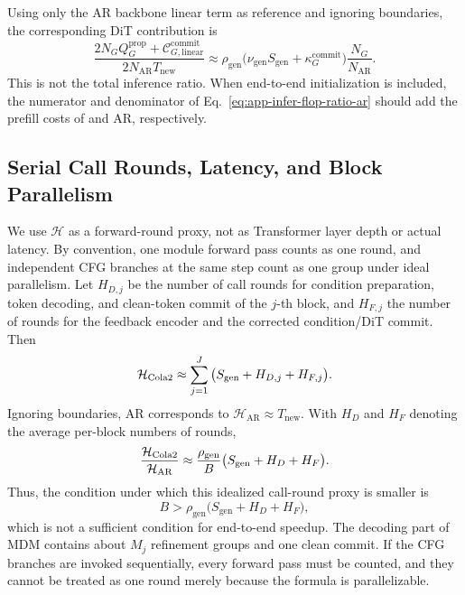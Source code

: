 Using only the AR backbone linear term as reference and ignoring boundaries, the corresponding DiT contribution is
\begin{equation}
    \frac{2N_GQ_G^{\mathrm{prop}}+\mathcal C_{G,\mathrm{linear}}^{\mathrm{commit}}}
         {2N_{\mathrm{AR}}T_{\mathrm{new}}}
    \approx\rho_{\mathrm{gen}}
      \big(\nu_{\mathrm{gen}}S_{\mathrm{gen}}+\kappa_G^{\mathrm{commit}}\big)
      \frac{N_G}{N_{\mathrm{AR}}}.
    \label{eq:app-cost-gen-linear-reference}
\end{equation}
This is not the total inference ratio. When end-to-end initialization is included, the numerator and denominator of Eq.~\eqref{eq:app-infer-flop-ratio-ar} should add the prefill costs of \method and AR, respectively.

\subsection{Serial Call Rounds, Latency, and Block Parallelism}

We use $\mathcal H$ as a forward-round proxy, not as Transformer layer depth or actual latency. By convention, one module forward pass counts as one round, and independent CFG branches at the same step count as one group under ideal parallelism. Let $H_{D,j}$ be the number of call rounds for condition preparation, token decoding, and clean-token commit of the $j$-th block, and $H_{F,j}$ the number of rounds for the feedback encoder and the corrected condition/DiT commit. Then
\begin{equation}
    \mathcal H_{\text{Cola2}}
    \approx\sum_{j=1}^{J}\big(S_{\mathrm{gen}}+H_{D,j}+H_{F,j}\big).
    \label{eq:app-cost-depth}
\end{equation}
Ignoring boundaries, AR corresponds to $\mathcal H_{\mathrm{AR}}\approx T_{\mathrm{new}}$. With $H_D$ and $H_F$ denoting the average per-block numbers of rounds,
\begin{equation}
    \frac{\mathcal H_{\text{Cola2}}}{\mathcal H_{\mathrm{AR}}}
    \approx\frac{\rho_{\mathrm{gen}}}{B}
      \big(S_{\mathrm{gen}}+H_D+H_F\big).
    \label{eq:app-depth-speedup-ar}
\end{equation}
Thus, the condition under which this idealized call-round proxy is smaller is
\begin{equation}
    B>\rho_{\mathrm{gen}}\big(S_{\mathrm{gen}}+H_D+H_F\big),
    \label{eq:app-depth-better-condition}
\end{equation}
which is not a sufficient condition for end-to-end speedup. The decoding part of MDM contains about $M_j$ refinement groups and one clean commit. If the CFG branches are invoked sequentially, every forward pass must be counted, and they cannot be treated as one round merely because the formula is parallelizable.

